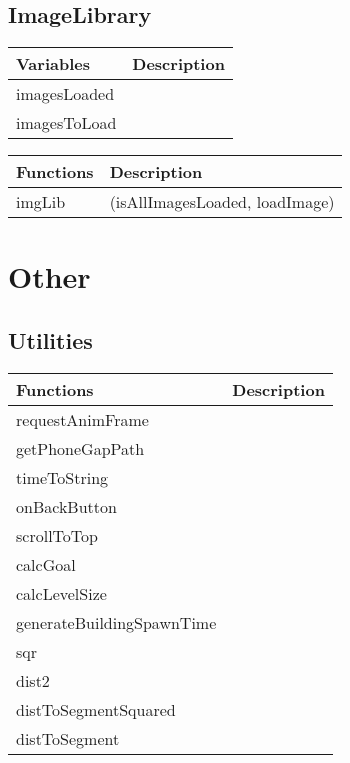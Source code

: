 \subsection*{ImageLibrary}
	
	\begin{table}[H]
	\begin{tabular}{p{4cm} | p{8cm} }
	\hline
	\rowcolor{gray}
	Variables & Description \\ \hline
	imagesLoaded & \\ \hline
	imagesToLoad & \\ \hline
	\end{tabular}
	\end{table}

	\begin{table}[H]
	\begin{tabular}{p{4cm} | p{8cm} }
	\hline
	\rowcolor{gray}
	Functions & Description \\ \hline
	imgLib & (isAllImagesLoaded, loadImage) \\ \hline	
	\end{tabular}
	\end{table}

\clearpage

\section{Other}

\subsection*{Utilities}

	\begin{table}[H]
	\begin{tabular}{p{6cm} | p{6cm} }
	\hline
	\rowcolor{gray}
	Functions & Description \\ \hline
	requestAnimFrame & \\ \hline
	getPhoneGapPath & \\ \hline
	timeToString & \\ \hline
	onBackButton & \\ \hline
	scrollToTop & \\ \hline
	calcGoal & \\ \hline
	calcLevelSize & \\ \hline
	generateBuildingSpawnTime & \\ \hline
	sqr & \\ \hline
	dist2 & \\ \hline
	distToSegmentSquared & \\ \hline
	distToSegment & \\ \hline

	\end{tabular}
	\end{table}

